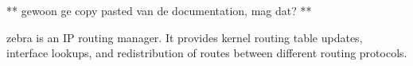 ** gewoon ge copy pasted van de documentation, mag dat? **

zebra is an IP routing manager. It provides kernel routing table updates, interface lookups, and redistribution of routes between different routing protocols.
